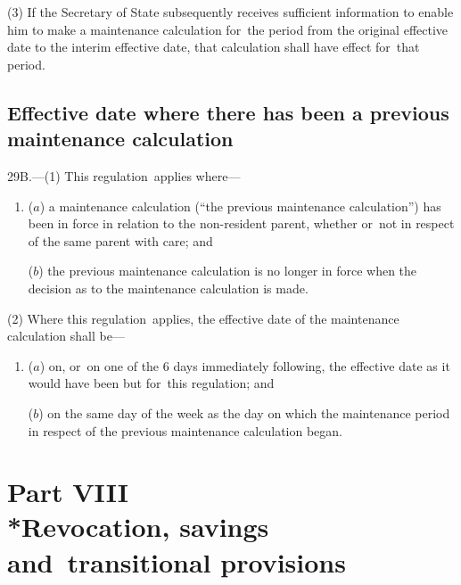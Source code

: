 \documentclass[12pt,a4paper]{article}
\begin{document}
(3) If the Secretary of State subsequently receives sufficient information to enable him to make a maintenance calculation for~the period from the original effective date to the interim effective date, that calculation shall have effect for~that period.


\subsection[29B. Effective date where there has been a previous maintenance calculation]{Effective date where there has been a previous maintenance calculation}

29B.---(1)  This regulation~applies where—
\begin{enumerate}\item[]
($a$) a maintenance calculation (“the previous maintenance calculation”) has been in force in relation to the non-resident parent, whether or~not in respect of the same parent with care; and

($b$) the previous maintenance calculation is no longer in force when the decision as to the maintenance calculation is made.
\end{enumerate}

(2) Where this regulation~applies, the effective date of the maintenance calculation shall be—
\begin{enumerate}\item[]
($a$) on, or~on one of the 6 days immediately following, the effective date as it would have been but for~this regulation; and

($b$) on the same day of the week as the day on which the maintenance period in respect of the previous maintenance calculation began.
\end{enumerate}


\section[Part VIII --- Revocation, savings and~transitional provisions]{\sloppy Part VIII\\*Revocation, savings and~transitional provisions}

\renewcommand\parthead{--- Part VIII}
\end{document}
